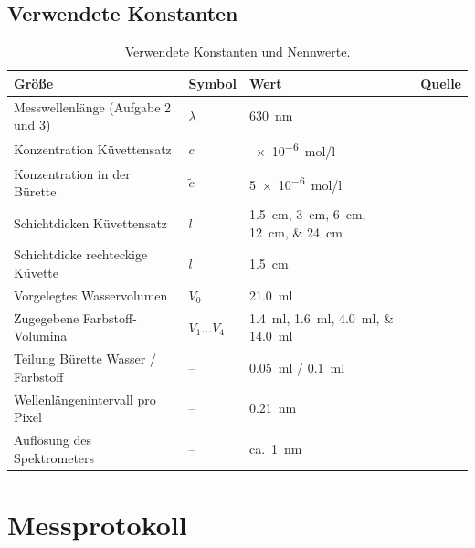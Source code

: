 \documentclass{article}
\begin{document}
\subsection{Verwendete Konstanten}
\label{sec:konstanten}

\begin{table}[htbp]
	\centering
	\small
	\begin{tabular}{@{}llll@{}}
		\toprule
		\textbf{Größe} & \textbf{Symbol} & \textbf{Wert} & \textbf{Quelle} \\
		\midrule
		Messwellenlänge (Aufgabe 2 und 3)       & $\lambda$     & \qty{630}{nm}              & \cite{anleitung} \\
		Konzentration Küvettensatz              & $c$           & \qty{e-6}{mol/l}           & \cite{anleitung} \\
		Konzentration in der Bürette            & $\tilde{c}$   & \qty{5e-6}{mol/l}          & \cite{anleitung} \\
		Schichtdicken Küvettensatz              & $l$           & \qtylist{1,5;3;6;12;24}{cm} & \cite{anleitung} \\
		Schichtdicke rechteckige Küvette        & $l$           & \qty{1,5}{cm}              & \cite{anleitung} \\
		Vorgelegtes Wasservolumen               & $V_0$         & \qty{21,0}{ml}             & \cite{anleitung} \\
		Zugegebene Farbstoff-Volumina           & $V_1 \dots V_4$ & \qtylist{1,4;1,6;4,0;14,0}{ml} & \cite{anleitung} \\
		Teilung Bürette Wasser / Farbstoff      & --            & \qty{0,05}{ml} / \qty{0,1}{ml} & \cite{anleitung} \\
		Wellenlängenintervall pro Pixel         & --            & \qty{0,21}{nm}             & \cite{anleitung} \\
		Auflösung des Spektrometers             & --            & ca.\ \qty{1}{nm}           & \cite{anleitung} \\
		\bottomrule
	\end{tabular}
	\caption{Verwendete Konstanten und Nennwerte.}
	\label{tab:konstanten}
\end{table}

\clearpage

\section{Messprotokoll}
\label{sec:messprotokoll}

% 
\end{document}
